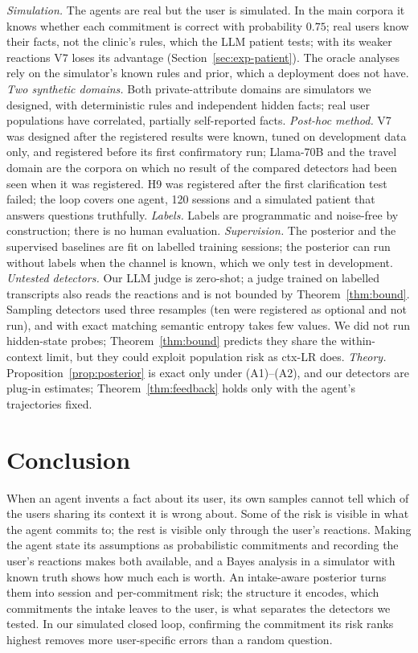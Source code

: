 \documentclass[10pt,a4paper,twocolumn]{article}
\begin{document}
\emph{Simulation.} The agents are real but the user is simulated. In the
main corpora it knows whether each commitment is correct with probability
$0.75$; real users know their facts, not the clinic's rules, which the LLM
patient tests; with its weaker reactions V7 loses its advantage
(Section~\ref{sec:exp-patient}). The oracle analyses rely on the simulator's known rules and prior, which a
deployment does not have. \emph{Two synthetic domains.} Both private-attribute domains are
simulators we designed, with deterministic rules and independent hidden
facts; real user populations have correlated, partially self-reported
facts.
\emph{Post-hoc method.} V7 was designed after the registered results
were known, tuned on development data only, and registered before its first
confirmatory run; Llama-70B and the travel domain are the corpora on which no result of the
compared detectors had been seen when it was registered. H9 was registered
after the first clarification test failed; the loop covers one agent, 120
sessions and a simulated patient that answers questions truthfully. \emph{Labels.} Labels are programmatic and noise-free by construction; there
is no human evaluation. \emph{Supervision.} The posterior and the supervised
baselines are fit on labelled training sessions; the posterior can run
without labels when the channel is known, which we only test in
development. \emph{Untested detectors.} Our LLM judge is zero-shot; a judge trained on
labelled transcripts also reads the reactions and is not bounded by
Theorem~\ref{thm:bound}. Sampling detectors used three resamples (ten were
registered as optional and not run), and with exact matching semantic
entropy takes few values. We did not run hidden-state probes;
Theorem~\ref{thm:bound} predicts they share the within-context limit, but
they could exploit population risk as ctx-LR does. \emph{Theory.} Proposition~\ref{prop:posterior} is exact only under (A1)--(A2), and our detectors are plug-in estimates; Theorem~\ref{thm:feedback} holds only with the agent's trajectories fixed.

\section{Conclusion}

When an agent invents a fact about its user, its own samples cannot tell which of the users sharing its context it is wrong about. Some of the risk is visible in what the agent commits to; the rest is visible only through the user's reactions. Making the agent state
its assumptions as probabilistic commitments and recording the user's
reactions makes both available, and a Bayes analysis in a simulator with
known truth shows how much each is worth. An intake-aware posterior turns
them into session and per-commitment risk; the structure it encodes, which
commitments the intake leaves to the user, is what separates the detectors
we tested. In our simulated closed loop, confirming the commitment its risk ranks
highest removes more user-specific errors than a random question.
\end{document}
